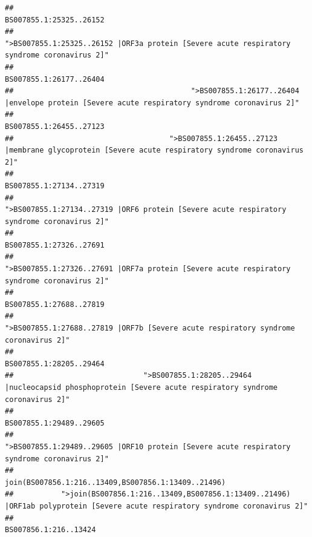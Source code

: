 \documentclass[
]{article}
\begin{document}
\begin{verbatim}
##                                                                                                                BS007855.1:25325..26152 
##                                            ">BS007855.1:25325..26152 |ORF3a protein [Severe acute respiratory syndrome coronavirus 2]" 
##                                                                                                                BS007855.1:26177..26404 
##                                         ">BS007855.1:26177..26404 |envelope protein [Severe acute respiratory syndrome coronavirus 2]" 
##                                                                                                                BS007855.1:26455..27123 
##                                    ">BS007855.1:26455..27123 |membrane glycoprotein [Severe acute respiratory syndrome coronavirus 2]" 
##                                                                                                                BS007855.1:27134..27319 
##                                             ">BS007855.1:27134..27319 |ORF6 protein [Severe acute respiratory syndrome coronavirus 2]" 
##                                                                                                                BS007855.1:27326..27691 
##                                            ">BS007855.1:27326..27691 |ORF7a protein [Severe acute respiratory syndrome coronavirus 2]" 
##                                                                                                                BS007855.1:27688..27819 
##                                                    ">BS007855.1:27688..27819 |ORF7b [Severe acute respiratory syndrome coronavirus 2]" 
##                                                                                                                BS007855.1:28205..29464 
##                              ">BS007855.1:28205..29464 |nucleocapsid phosphoprotein [Severe acute respiratory syndrome coronavirus 2]" 
##                                                                                                                BS007855.1:29489..29605 
##                                            ">BS007855.1:29489..29605 |ORF10 protein [Severe acute respiratory syndrome coronavirus 2]" 
##                                                                                    join(BS007856.1:216..13409,BS007856.1:13409..21496) 
##           ">join(BS007856.1:216..13409,BS007856.1:13409..21496) |ORF1ab polyprotein [Severe acute respiratory syndrome coronavirus 2]" 
##                                                                                                                  BS007856.1:216..13424 

\end{verbatim}
\end{document}
